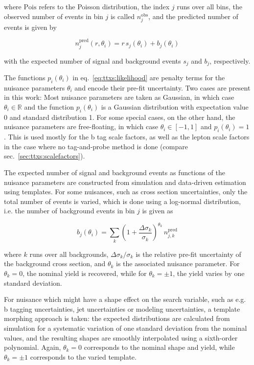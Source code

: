 where $\mathrm{Pois}$ refers to the Poisson distribution, the index $j$ runs over all bins, the observed number of events in bin $j$ is called $n_j^{\text{obs}}$, and the predicted number of events is given by

\begin{equation}
    n_j^{\text{pred}} (r, \theta_i) = r \, s_j (\theta_i) + b_j (\theta_i)
\end{equation}

with the expected number of signal and background events $s_j$ and $b_j$, respectively. 

The functions $p_i ( \theta_i )$ in eq.~\ref{eq:ttxs:likelihood} are penalty terms for the nuisance parameters $\theta_i$ and encode their pre-fit uncertainty. Two cases are present in this work: Most nuisance parameters are taken as Gaussian, in which case $\theta_i \in \mathbb{R}$ and the function $p_i ( \theta_i )$ is a Gaussian distribution with expectation value 0 and standard distribution 1. For some special cases, on the other hand, the nuisance parameters are free-floating, in which case $\theta_i \in [-1,1]$ and $p_i ( \theta_i ) = 1$. This is used mostly for the b tag scale factors, as well as the lepton scale factors in the case where no tag-and-probe method is done (compare sec.~\ref{sec:ttxs:scalefactors}).

The expected number of signal and background events as functions of the nuisance parameters are constructed from simulation and data-driven estimation using templates. For some nuisances, such as cross section uncertainties, only the total number of events is varied, which is done using a log-normal distribution, i.e. the number of background events in bin $j$ is given as

\begin{equation}
    b_j (\theta_i) = \sum_k \left(1 + \frac{\Delta\sigma_k} {\sigma_k} \right)^{\theta_k} \, n_{j,k}^{\text{pred}}
\end{equation}

where $k$ runs over all backgrounds, $\Delta\sigma_k / \sigma_k$ is the relative pre-fit uncertainty of the background cross section, and $\theta_k$ is the associated nuisance parameter. For $\theta_k = 0$, the nominal yield is recovered, while for $\theta_k = \pm 1$, the yield varies by one standard deviation.

For nuisance which might have a shape effect on the search variable, such as e.g. b tagging uncertainties, jet uncertainties or modeling uncertainties, a template morphing approach is taken: the expected distributions are calculated from simulation for a systematic variation of one standard deviation from the nominal values, and the resulting shapes are smoothly interpolated using a sixth-order polynomial. Again, $\theta_k = 0$ corresponds to the nominal shape and yield, while $\theta_k = \pm 1$ corresponds to the varied template. 


